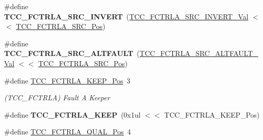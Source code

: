 \begin{DoxyCompactItemize}
\item 
\hypertarget{group___s_a_m_l21___t_c_c_ga80bb0c36615144e5aace5f9e02a83df0}{}\#define {\bfseries T\+C\+C\+\_\+\+F\+C\+T\+R\+L\+A\+\_\+\+S\+R\+C\+\_\+\+I\+N\+V\+E\+R\+T}~(\hyperlink{group___s_a_m_l21___t_c_c_ga8d29df4e62b3e4280e08626c9119bd7b}{T\+C\+C\+\_\+\+F\+C\+T\+R\+L\+A\+\_\+\+S\+R\+C\+\_\+\+I\+N\+V\+E\+R\+T\+\_\+\+Val}     $<$$<$ \hyperlink{group___s_a_m_l21___t_c_c_ga402acbd670b494207ddf863d2b4235e3}{T\+C\+C\+\_\+\+F\+C\+T\+R\+L\+A\+\_\+\+S\+R\+C\+\_\+\+Pos})\label{group___s_a_m_l21___t_c_c_ga80bb0c36615144e5aace5f9e02a83df0}

\item 
\hypertarget{group___s_a_m_l21___t_c_c_gaa85fb81740ef5722831065e8fe63702f}{}\#define {\bfseries T\+C\+C\+\_\+\+F\+C\+T\+R\+L\+A\+\_\+\+S\+R\+C\+\_\+\+A\+L\+T\+F\+A\+U\+L\+T}~(\hyperlink{group___s_a_m_l21___t_c_c_ga7ab0b9cdeb48ae88c9b1390c9714aa1a}{T\+C\+C\+\_\+\+F\+C\+T\+R\+L\+A\+\_\+\+S\+R\+C\+\_\+\+A\+L\+T\+F\+A\+U\+L\+T\+\_\+\+Val}   $<$$<$ \hyperlink{group___s_a_m_l21___t_c_c_ga402acbd670b494207ddf863d2b4235e3}{T\+C\+C\+\_\+\+F\+C\+T\+R\+L\+A\+\_\+\+S\+R\+C\+\_\+\+Pos})\label{group___s_a_m_l21___t_c_c_gaa85fb81740ef5722831065e8fe63702f}

\item 
\hypertarget{group___s_a_m_l21___t_c_c_gaabd12c34a2980fc69a684fda1c000659}{}\#define \hyperlink{group___s_a_m_l21___t_c_c_gaabd12c34a2980fc69a684fda1c000659}{T\+C\+C\+\_\+\+F\+C\+T\+R\+L\+A\+\_\+\+K\+E\+E\+P\+\_\+\+Pos}~3\label{group___s_a_m_l21___t_c_c_gaabd12c34a2980fc69a684fda1c000659}

\begin{DoxyCompactList}\small\item\em (T\+C\+C\+\_\+\+F\+C\+T\+R\+L\+A) Fault A Keeper \end{DoxyCompactList}\item 
\hypertarget{group___s_a_m_l21___t_c_c_gaf7cc981924ee0718ce347407968b8bae}{}\#define {\bfseries T\+C\+C\+\_\+\+F\+C\+T\+R\+L\+A\+\_\+\+K\+E\+E\+P}~(0x1ul $<$$<$ T\+C\+C\+\_\+\+F\+C\+T\+R\+L\+A\+\_\+\+K\+E\+E\+P\+\_\+\+Pos)\label{group___s_a_m_l21___t_c_c_gaf7cc981924ee0718ce347407968b8bae}

\item 
\hypertarget{group___s_a_m_l21___t_c_c_ga3c1ea30409086443f451d699ee57bebc}{}\#define \hyperlink{group___s_a_m_l21___t_c_c_ga3c1ea30409086443f451d699ee57bebc}{T\+C\+C\+\_\+\+F\+C\+T\+R\+L\+A\+\_\+\+Q\+U\+A\+L\+\_\+\+Pos}~4\label{group___s_a_m_l21___t_c_c_ga3c1ea30409086443f451d699ee57bebc}


\end{DoxyCompactItemize}
